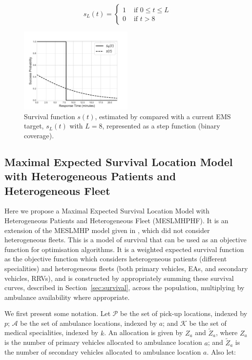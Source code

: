 \documentclass[preprint,12pt]{elsarticle}
\begin{document}
\begin{equation}\label{eqn:survival_cutoff}
    s_L(t) = \begin{cases}
    1 & \text{ if } 0\leq t \leq L \\
    0 & \text{ if } t > 8 
    \end{cases}
\end{equation}

\begin{figure}[ht]
\centering
  \includegraphics[width=0.5\textwidth]{img/Survival_Function.pdf}
    \caption{Survival function $s(t)$, estimated by \cite{Valenzuela20001206}
             compared with a current EMS target, $s_L(t)$ with $L=8$,
             represented as a step function (binary coverage).}
  \label{fig:survivalfunction}
\end{figure}


\subsection{Maximal Expected Survival Location Model with Heterogeneous
            Patients and Heterogeneous Fleet}\label{sec:meslmhphf}
Here we propose a Maximal Expected Survival Location Model with Heterogeneous
Patients and Heterogeneous Fleet (MESLMHPHF). It is an extension of the
MESLMHP model given in \cite{Knight2012918}, which did not consider
heterogeneous fleets. This is a model of survival that can be used as an
objective function for optimisation algorithms. It is a weighted expected
survival function as the objective function which considers heterogeneous
patients (different specialities) and heterogeneous fleets (both primary
vehicles, EAs, and secondary vehicles, RRVs), and is constructed by
appropriately summing these survival curves, described in
Section~\ref{sec:survival}, across the population, multiplying by ambulance
availability where appropriate.

We first present some notation. Let $\mathcal{P}$ be the set of pick-up
locations, indexed by $p$; $\mathcal{A}$ be the set of ambulance locations,
indexed by $a$; and $\mathcal{K}$ be the set of medical specialities, indexed
by $k$.
An allocation is given by $Z_a$ and $\tilde{Z}_a$, where $Z_a$ is the number
of primary vehicles allocated to ambulance location $a$; and $\tilde{Z}_a$ is
the number of secondary vehicles allocated to ambulance location $a$. Also
let:
\end{document}
